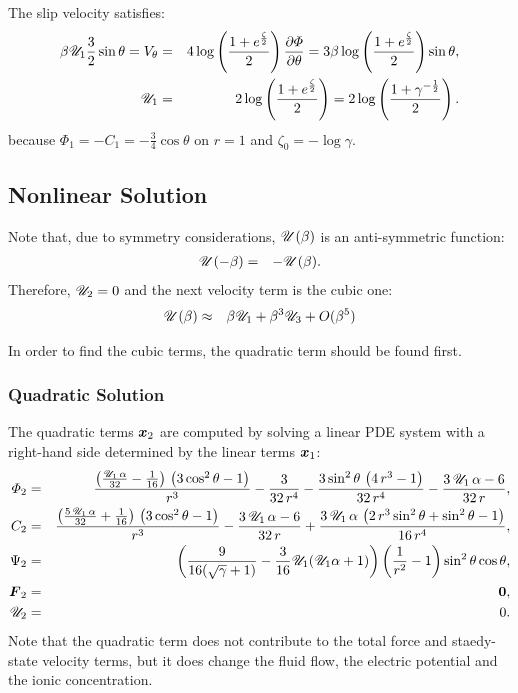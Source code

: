 The slip velocity satisfies:
\begin{eqnarray}
\beta \mathscr{U}_1 \frac{3}{2} \sin\theta =
V_\theta &=& 4 \log \left(\frac{1 + e ^ \frac{\zeta}{2}}{2}\right) \frac{\partial \varPhi}{\partial \theta} 
=
 3 \beta \log \left(\frac{1 + e ^ \frac{\zeta}{2}}{2}\right) \sin\theta, \\
\mathscr{U}_1 &=& 2 \log \left(\frac{1 + e ^ \frac{\zeta}{2}}{2}\right) 
       =  2 \log \left(\frac{1 + \gamma ^ {-\frac{1}{2}}}{2}\right).
\end{eqnarray}
because $\varPhi_1 = -C_1 = -\frac{3}{4} \cos\theta$ on $r=1$
and $\zeta_0 = -\log\gamma$.

\subsection{Nonlinear Solution}
Note that, due to symmetry considerations, $\mathscr{U}(\beta)$ is an anti-symmetric function:
\begin{eqnarray}
\mathscr{U}(-\beta) &=& -\mathscr{U}(\beta).
\end{eqnarray}
Therefore, $\mathscr{U}_2 = 0$ and the next velocity term is the cubic one:
\begin{eqnarray}
\mathscr{U}(\beta) &\approx& \beta \mathscr{U}_1 + \beta^3 \mathscr{U}_3 + O(\beta^5)
\end{eqnarray}

In order to find the cubic terms, the quadratic term should be found first.

\subsubsection{Quadratic Solution}
The quadratic terms $\boldsymbol{x}_2$ are computed by solving a linear PDE system 
with a right-hand side determined by the linear terms $\boldsymbol{x}_1$:
\begin{eqnarray}
\varPhi_2 &=& \frac{\left(\frac{\mathscr{U}_1\, \alpha}{32} - \frac{1}{16}\right)\, \left(3\, {\cos^2\theta} - 1\right)}{r^3} - \frac{3}{32\, r^4} - \frac{3\, {\sin^2\theta}\, \left(4\, r^3 - 1\right)}{32\, r^4} - \frac{3\, \mathscr{U}_1\, \alpha - 6}{32\, r},
\\
C_2 &=& \frac{\left(\frac{5\, \mathscr{U}_1\, \alpha}{32} + \frac{1}{16}\right)\, \left(3\, {\cos^2\theta} - 1\right)}{r^3} - \frac{3\, \mathscr{U}_1\, \alpha - 6}{32\, r} + \frac{3\, \mathscr{U}_1\, \alpha\, \left(2\, r^3\, {\sin^2\theta} + {\sin^2\theta} - 1\right)}{16\, r^4},
\\
\Psi_2 &=& \left(\frac{9}{16(\sqrt{\gamma}+1)} - \frac{3}{16} \mathscr{U}_1 (\mathscr{U}_1 \alpha + 1)\right)
 \left(\frac{1}{r^2} - 1\right) \sin^2\theta \cos\theta,  \\
\boldsymbol{F}_2 &=& \boldsymbol{0}, \\ \mathscr{U}_2 &=& 0.
\end{eqnarray}
Note that the quadratic term does not contribute to the total force and staedy-state 
velocity terms, but it does change the fluid flow, 
the electric potential and the ionic concentration.

